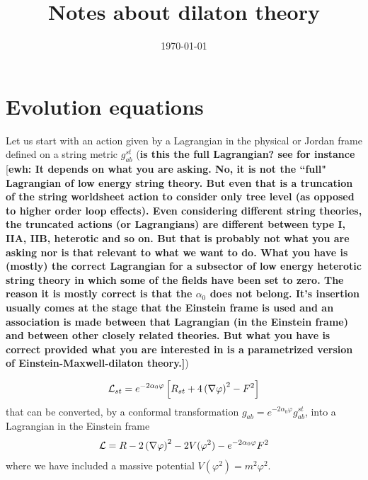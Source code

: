 \documentclass[letter,prd,aps,floatfix,superscriptaddress]{revtex4}
\def\ewh#1{{\textcolor{Emerald}{[\bf ewh: #1]}}}
\begin{document}
\date{\today}
\title{Notes about dilaton theory}

\maketitle




\section{Evolution equations}

Let us start with an action given by a Lagrangian in the physical
or Jordan frame defined on a string metric $g^{st}_{ab}$
({\bf is this the full Lagrangian? see for instance~\cite{1994GReGr..26.1171D}} 
{\ewh{It depends on what you are asking.  No, it is not the ``full" Lagrangian 
of low energy string theory.  But even that is a truncation of the string 
worldsheet action to consider only tree level (as opposed to higher order 
loop effects).  Even considering different string theories, the truncated 
actions (or Lagrangians) are different between type I, IIA, IIB, heterotic and 
so on.  But that is probably not what you are asking nor is that relevant to 
what we want to do.  What you have is (mostly) the correct Lagrangian for a 
subsector of low energy heterotic string theory in which some 
of the fields have been set to zero.  The reason it is mostly correct is 
that the $\alpha_0$ does not belong.  It's insertion usually comes at the 
stage that the Einstein frame is used and an association is made between that
Lagrangian (in the Einstein frame) and between other closely related  
theories.  But what you have is correct provided what you are interested in 
is a parametrized version of Einstein-Maxwell-dilaton theory.}})

\begin{eqnarray}
  {\cal L}_{st} =e^{-2 \alpha_0 \varphi} \left[ R_{st} + 4 \left( \nabla \varphi \right)^2 - F^2 \right]
\end{eqnarray}
that can be converted, by a conformal transformation
 $g_{ab} = e^{-2 \alpha_0 \varphi} g^{st}_{ab}$, into a Lagrangian in the Einstein frame 
\begin{eqnarray}
  {\cal L} = R - 2 \left( \nabla \varphi \right)^2 - 2 V(\varphi^2)- e^{-2 \alpha_0 \varphi} F^2
\end{eqnarray}
where we have included a massive potential $V(\varphi^2) = m^2 \varphi^2$.
\end{document}
